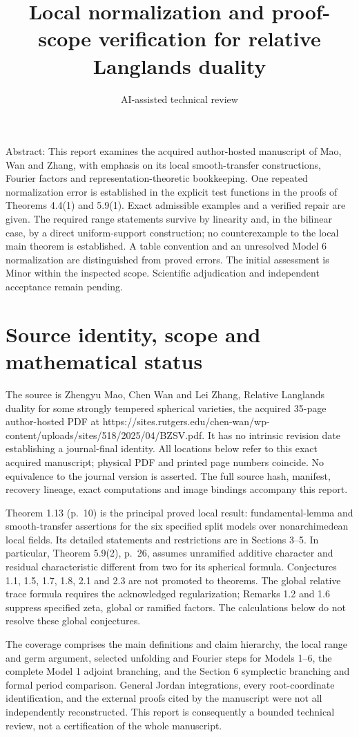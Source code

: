 \documentclass[10pt]{article}
\title{Local normalization and proof-scope verification for relative Langlands duality}
\author{AI-assisted technical review}
\date{}
\begin{document}
\maketitle
Abstract: This report examines the acquired author-hosted manuscript of Mao, Wan and Zhang, with emphasis on its local smooth-transfer constructions, Fourier factors and representation-theoretic bookkeeping. One repeated normalization error is established in the explicit test functions in the proofs of Theorems 4.4(1) and 5.9(1). Exact admissible examples and a verified repair are given. The required range statements survive by linearity and, in the bilinear case, by a direct uniform-support construction; no counterexample to the local main theorem is established. A table convention and an unresolved Model 6 normalization are distinguished from proved errors. The initial assessment is Minor within the inspected scope. Scientific adjudication and independent acceptance remain pending.\par
\section*{Source identity, scope and mathematical status}
The source is Zhengyu Mao, Chen Wan and Lei Zhang, Relative Langlands duality for some strongly tempered spherical varieties, the acquired 35-page author-hosted PDF at https://sites.rutgers.edu/chen-wan/wp-content/uploads/sites/518/2025/04/BZSV.pdf. It has no intrinsic revision date establishing a journal-final identity. All locations below refer to this exact acquired manuscript; physical PDF and printed page numbers coincide. No equivalence to the journal version is asserted. The full source hash, manifest, recovery lineage, exact computations and image bindings accompany this report.\par
Theorem 1.13 (p. 10) is the principal proved local result: fundamental-lemma and smooth-transfer assertions for the six specified split models over nonarchimedean local fields. Its detailed statements and restrictions are in Sections 3–5. In particular, Theorem 5.9(2), p. 26, assumes unramified additive character and residual characteristic different from two for its spherical formula. Conjectures 1.1, 1.5, 1.7, 1.8, 2.1 and 2.3 are not promoted to theorems. The global relative trace formula requires the acknowledged regularization; Remarks 1.2 and 1.6 suppress specified zeta, global or ramified factors. The calculations below do not resolve these global conjectures.\par
The coverage comprises the main definitions and claim hierarchy, the local range and germ argument, selected unfolding and Fourier steps for Models 1–6, the complete Model 1 adjoint branching, and the Section 6 symplectic branching and formal period comparison. General Jordan integrations, every root-coordinate identification, and the external proofs cited by the manuscript were not all independently reconstructed. This report is consequently a bounded technical review, not a certification of the whole manuscript.\par
\end{document}

